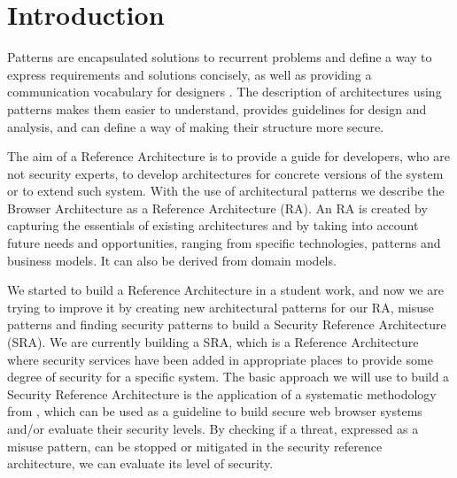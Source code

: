 \documentclass{sig-alternate-05-2015}
\begin{document}





\section{Introduction}
Patterns are encapsulated solutions to recurrent problems and define a way to express requirements and solutions concisely, as well as providing a communication vocabulary for designers \cite{gamma1994design}. The description of architectures using patterns makes them easier to understand, provides guidelines for design and analysis, and can define a way of making their structure more secure.

The aim of a Reference Architecture is to provide a guide for developers, who are not security experts, to develop architectures for concrete versions of the system or to extend such system. With the use of architectural patterns we describe the Browser Architecture as a Reference Architecture (RA). An RA is created by capturing the essentials of existing architectures and by taking into account future needs and opportunities, ranging from specific technologies, patterns and business models. It can also be derived from domain models.


We started to build a Reference Architecture in a student work, and now we are trying to improve it by creating new architectural patterns for our RA, misuse patterns and finding security patterns to build a Security Reference Architecture (SRA). We are currently building a SRA, which is a Reference Architecture where security services have been added in appropriate places to provide some degree of security for a specific system. The basic approach we will use to build a Security Reference Architecture is the application of a systematic methodology from \cite{fernandez2006methodology,Fernandez2011,Fernandez2015}, which can be used as a guideline to build secure web browser systems and/or evaluate their security levels. By checking if a threat, expressed as a misuse pattern, can be stopped or mitigated in the security reference architecture, we can evaluate its level of security.
\end{document}
